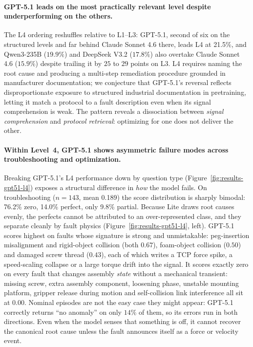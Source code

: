 \paragraph{GPT-5.1 leads on the most practically relevant level despite underperforming on the others.}
The L4 ordering reshuffles relative to L1--L3: GPT-5.1, second of six on the structured levels and far behind Claude Sonnet 4.6 there, leads L4 at 21.5\%, and Qwen3-235B ($19.9\%$) and DeepSeek V3.2 ($17.8\%$) also overtake Claude Sonnet 4.6 ($15.9\%$) despite trailing it by $25$ to $29$ points on L3. L4 requires naming the root cause and producing a multi-step remediation procedure grounded in manufacturer documentation; we conjecture that GPT-5.1's reversal reflects disproportionate exposure to structured industrial documentation in pretraining, letting it match a protocol to a fault description even when its signal comprehension is weak. The pattern reveals a dissociation between \emph{signal comprehension} and \emph{protocol retrieval}: optimizing for one does not deliver the other.

\paragraph{Within Level~4, GPT-5.1 shows asymmetric failure modes across troubleshooting and optimization.}
Breaking GPT-5.1's L4 performance down by question type (Figure~\ref{fig:results-gpt51-l4}) exposes a structural difference in \emph{how} the model fails. On troubleshooting ($n{=}143$, mean 0.189) the score distribution is sharply bimodal: 76.2\% zero, 14.0\% perfect, only 9.8\% partial. Because Lite draws root causes evenly, the perfects cannot be attributed to an over-represented class, and they separate cleanly by fault physics (Figure~\ref{fig:results-gpt51-l4}, left). GPT-5.1 scores highest on faults whose signature is strong and unmistakable: peg-insertion misalignment and rigid-object collision (both $0.67$), foam-object collision ($0.50$) and damaged screw thread ($0.43$), each of which writes a TCP force spike, a speed-scaling collapse or a large torque drift into the signal. It scores exactly zero on every fault that changes assembly \emph{state} without a mechanical transient: missing screw, extra assembly component, loosening phase, unstable mounting platform, gripper release during motion and self-collision link interference all sit at $0.00$. Nominal episodes are not the easy case they might appear: GPT-5.1 correctly returns ``no anomaly'' on only $14\%$ of them, so its errors run in both directions. Even when the model senses that something is off, it cannot recover the canonical root cause unless the fault announces itself as a force or velocity event.

